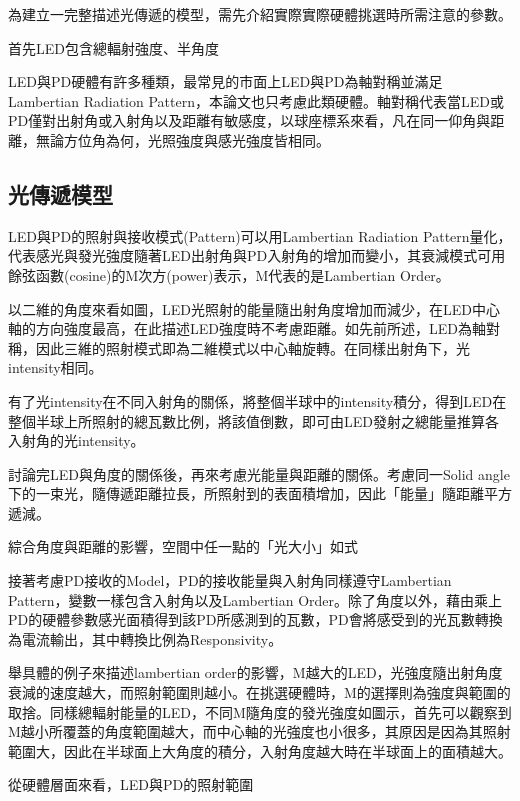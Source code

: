        為建立一完整描述光傳遞的模型，需先介紹實際實際硬體挑選時所需注意的參數。

        首先LED包含總輻射強度、半角度
        
        LED與PD硬體有許多種類，最常見的市面上LED與PD為軸對稱並滿足Lambertian Radiation Pattern，本論文也只考慮此類硬體。軸對稱代表當LED或PD僅對出射角或入射角以及距離有敏感度，以球座標系來看，凡在同一仰角與距離，無論方位角為何，光照強度與感光強度皆相同。

    \subsection{光傳遞模型}

        LED與PD的照射與接收模式(Pattern)可以用Lambertian Radiation Pattern量化，代表感光與發光強度隨著LED出射角與PD入射角的增加而變小，其衰減模式可用餘弦函數(cosine)的M次方(power)表示，M代表的是Lambertian Order。

        以二維的角度來看如圖，LED光照射的能量隨出射角度增加而減少，在LED中心軸的方向強度最高，在此描述LED強度時不考慮距離。如先前所述，LED為軸對稱，因此三維的照射模式即為二維模式以中心軸旋轉。在同樣出射角下，光intensity相同。
        
        有了光intensity在不同入射角的關係，將整個半球中的intensity積分，得到LED在整個半球上所照射的總瓦數比例，將該值倒數，即可由LED發射之總能量推算各入射角的光intensity。
        
        討論完LED與角度的關係後，再來考慮光能量與距離的關係。考慮同一Solid angle下的一束光，隨傳遞距離拉長，所照射到的表面積增加，因此「能量」隨距離平方遞減。
        
        綜合角度與距離的影響，空間中任一點的「光大小」如式
        
        接著考慮PD接收的Model，PD的接收能量與入射角同樣遵守Lambertian Pattern，變數一樣包含入射角以及Lambertian Order。除了角度以外，藉由乘上PD的硬體參數感光面積得到該PD所感測到的瓦數，PD會將感受到的光瓦數轉換為電流輸出，其中轉換比例為Responsivity。
        
        舉具體的例子來描述lambertian order的影響，M越大的LED，光強度隨出射角度衰減的速度越大，而照射範圍則越小。在挑選硬體時，M的選擇則為強度與範圍的取捨。同樣總輻射能量的LED，不同M隨角度的發光強度如圖示，首先可以觀察到M越小所覆蓋的角度範圍越大，而中心軸的光強度也小很多，其原因是因為其照射範圍大，因此在半球面上大角度的積分，入射角度越大時在半球面上的面積越大。
        
        從硬體層面來看，LED與PD的照射範圍





